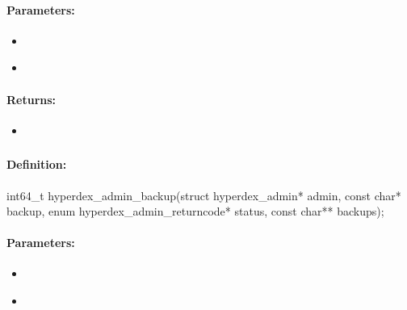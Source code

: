 \paragraph{Parameters:}
\begin{itemize}[noitemsep]
\item {}\\

\item {}\\

\end{itemize}

\paragraph{Returns:}
\begin{itemize}[noitemsep]
\item {}\\

\end{itemize}

\pagebreak
\subsubsection{}
\label{api:c:backup}


\paragraph{Definition:}
\begin{ccode}
int64_t hyperdex_admin_backup(struct hyperdex_admin* admin,
        const char* backup,
        enum hyperdex_admin_returncode* status,
        const char** backups);
\end{ccode}

\paragraph{Parameters:}
\begin{itemize}[noitemsep]
\item {}\\

\item {}\\

\end{itemize}

